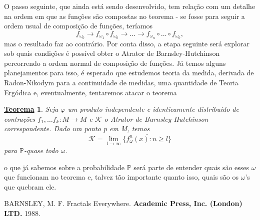 \documentclass[12pt]{article}
\newtheorem*{theorem*}{\underline{Teorema}}
\theoremstyle{definition}
\begin{document}
O passo seguinte, que ainda está sendo desenvolvido, tem relação com um detalhe na ordem em que as funções são compostas no teorema - se fosse para seguir a ordem
usual de composição de funções, teríamos
\[
	f_{\omega_{0}}\rightarrow f_{\omega_{1}}\circ f_{\omega_{0}}\rightarrow \dotsc \rightarrow f_{\omega_{n}}\circ \dotsc \circ f_{\omega_{0}},
\]
mas o resultado faz ao contrário. Por conta disso, a etapa seguinte será explorar sob quais condições é possível obter o Atrator de Barnsley-Hutchinson percorrendo a ordem normal
de composição de funções. Já temos alguns planejamentos para isso, é esperado que estudemos teoria da medida, derivada de Radon-Nikodym para a continuidade de medidas, uma quantidade de
Teoria Ergódica e, eventualmente, tentaremos atacar o teorema
\begin{theorem*}
	Seja \(\varphi \) um produto independente e identicamente distribuído de contrações \(f_{1},\dotsc f_{k}:M\rightarrow M\) e \(\mathcal{K}\) o Atrator de Barnsley-Hutchinson correspondente. Dado um
	ponto p em M, temos
	\[
		\mathcal{K}=\lim_{l\to \infty}\overline{\{f_{\omega }^{n}(x): n\geq l\}}
	\]
	para \(\mathbb{P}\)-quase todo \(\omega \).
\end{theorem*}
o que já sabemos sobre a probabilidade \(\mathbb{P}\) será parte de entender quais são esses \(\omega \) que funcionam no teorema e, talvez tão importante quanto isso,
quais são os \(\omega \)'s que quebram ele.

\begin{thebibliography}{99}
	 BARNSLEY, M. F. Fractals Everywhere. \textbf{Academic Press, Inc. (London) LTD.} 1988.
\end{thebibliography}
\end{document}
